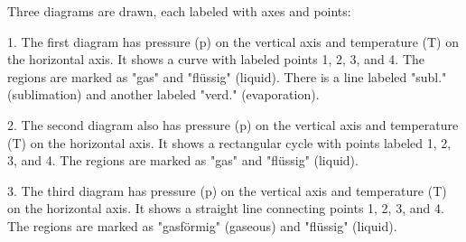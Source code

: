 Three diagrams are drawn, each labeled with axes and points:  

1. The first diagram has pressure (p) on the vertical axis and temperature (T) on the horizontal axis. It shows a curve with labeled points 1, 2, 3, and 4. The regions are marked as "gas" and "flüssig" (liquid). There is a line labeled "subl." (sublimation) and another labeled "verd." (evaporation).  

2. The second diagram also has pressure (p) on the vertical axis and temperature (T) on the horizontal axis. It shows a rectangular cycle with points labeled 1, 2, 3, and 4. The regions are marked as "gas" and "flüssig" (liquid).  

3. The third diagram has pressure (p) on the vertical axis and temperature (T) on the horizontal axis. It shows a straight line connecting points 1, 2, 3, and 4. The regions are marked as "gasförmig" (gaseous) and "flüssig" (liquid).